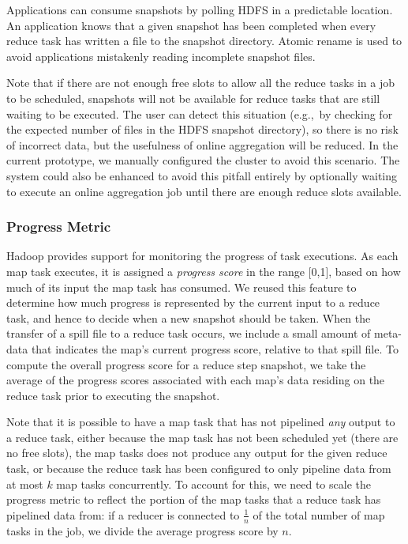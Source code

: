 Applications can consume snapshots by polling HDFS in a predictable
location. An application knows that a given snapshot has been
completed when every reduce task has written a file to the snapshot
directory.  Atomic rename is used to avoid applications mistakenly
reading incomplete snapshot files.

Note that if there are not enough free slots to allow all the reduce tasks in a
job to be scheduled, snapshots will not be available for reduce tasks that are
still waiting to be executed. The user can detect this situation (e.g.,\ by
checking for the expected number of files in the HDFS snapshot directory), so
there is no risk of incorrect data, but the usefulness of online aggregation
will be reduced. In the current prototype, we manually configured the cluster to
avoid this scenario. The system could also be enhanced to avoid this pitfall
entirely by optionally waiting to execute an online aggregation job until there
are enough reduce slots available.

\subsubsection{Progress Metric}
\label{ch:hop:sec:online-metric}

Hadoop provides support for monitoring the progress of task executions.  As
each map task executes, it is assigned a \emph{progress score} in the range
[0,1], based on how much of its input the map task has consumed.  We reused
this feature to determine how much progress is represented by the current input
to a reduce task, and hence to decide when a new snapshot should be taken.
When the transfer of a spill file to a reduce task occurs, we include a small
amount of meta-data that indicates the map's current progress score, relative
to that spill file.  To compute the overall progress score for a reduce step
snapshot, we take the average of the progress scores associated with each map's
data residing on the reduce task prior to executing the snapshot. 

Note that it is possible to have a map task that has not pipelined \emph{any}
output to a reduce task, either because the map task has not been scheduled yet
(there are no free {\TT} slots), the map tasks does not produce any output for
the given reduce task, or because the reduce task has been configured to only
pipeline data from at most $k$ map tasks concurrently.  To account for this, we
need to scale the progress metric to reflect the portion of the map tasks that
a reduce task has pipelined data from: if a reducer is connected to
$\frac{1}{n}$ of the total number of map tasks in the job, we divide the
average progress score by $n$.

